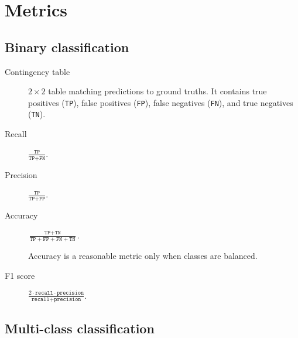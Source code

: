 \section{Metrics}


\subsection{Binary classification}

\begin{description}
    \item[Contingency table] 
        $2 \times 2$ table matching predictions to ground truths. It contains true positives (\texttt{TP}), false positives (\texttt{FP}), false negatives (\texttt{FN}), and true negatives (\texttt{TN}).

    \item[Recall]  
        $\frac{\texttt{TP}}{\texttt{TP} + \texttt{FN}}$.

    \item[Precision]  
        $\frac{\texttt{TP}}{\texttt{TP} + \texttt{FP}}$.

    \item[Accuracy]  
        $\frac{\texttt{TP} + \texttt{TN}}{\texttt{TP} + \texttt{FP} + \texttt{FN} + \texttt{TN}}$.

        \begin{remark}
            Accuracy is a reasonable metric only when classes are balanced.
        \end{remark}

    \item[F1 score]  
        $\frac{2 \cdot \texttt{recall} \cdot \texttt{precision}}{\texttt{recall} + \texttt{precision}}$.
\end{description}


\subsection{Multi-class classification}

